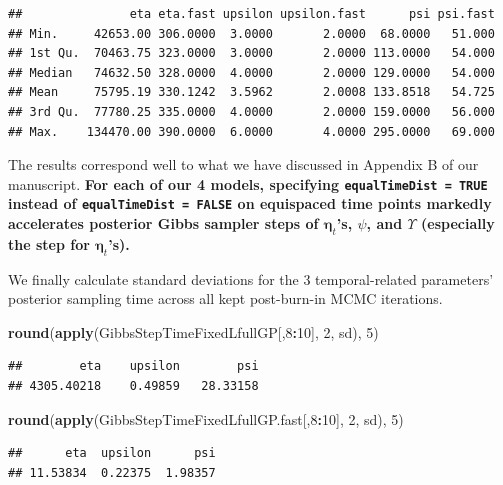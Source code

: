 \documentclass[
]{article}
\newenvironment{Shaded}{\begin{snugshade}}{\end{snugshade}}
\newcommand{\DecValTok}[1]{\textcolor[rgb]{0.00,0.00,0.81}{#1}}
\newcommand{\FunctionTok}[1]{\textcolor[rgb]{0.13,0.29,0.53}{\textbf{#1}}}
\newcommand{\NormalTok}[1]{#1}
\newcommand{\SpecialCharTok}[1]{\textcolor[rgb]{0.81,0.36,0.00}{\textbf{#1}}}
\begin{document}
\begin{verbatim}
##               eta eta.fast upsilon upsilon.fast      psi psi.fast
## Min.     42653.00 306.0000  3.0000       2.0000  68.0000   51.000
## 1st Qu.  70463.75 323.0000  3.0000       2.0000 113.0000   54.000
## Median   74632.50 328.0000  4.0000       2.0000 129.0000   54.000
## Mean     75795.19 330.1242  3.5962       2.0008 133.8518   54.725
## 3rd Qu.  77780.25 335.0000  4.0000       2.0000 159.0000   56.000
## Max.    134470.00 390.0000  6.0000       4.0000 295.0000   69.000
\end{verbatim}

The results correspond well to what we have discussed in Appendix B of
our manuscript. \textbf{For each of our 4 models, specifying
\texttt{equalTimeDist\ =\ TRUE} instead of
\texttt{equalTimeDist\ =\ FALSE} on equispaced time points markedly
accelerates posterior Gibbs sampler steps of \(\bm{\eta}_t\)'s,
\(\psi\), and \(\Upsilon\) (especially the step for \(\bm{\eta}_t\)'s).}

We finally calculate standard deviations for the 3 temporal-related
parameters' posterior sampling time across all kept post-burn-in MCMC
iterations.

\begin{Shaded}
\begin{Highlighting}[]
\FunctionTok{round}\NormalTok{(}\FunctionTok{apply}\NormalTok{(GibbsStepTimeFixedLfullGP[,}\DecValTok{8}\SpecialCharTok{:}\DecValTok{10}\NormalTok{], }\DecValTok{2}\NormalTok{, sd), }\DecValTok{5}\NormalTok{)}
\end{Highlighting}
\end{Shaded}

\begin{verbatim}
##        eta    upsilon        psi 
## 4305.40218    0.49859   28.33158
\end{verbatim}

\begin{Shaded}
\begin{Highlighting}[]
\FunctionTok{round}\NormalTok{(}\FunctionTok{apply}\NormalTok{(GibbsStepTimeFixedLfullGP.fast[,}\DecValTok{8}\SpecialCharTok{:}\DecValTok{10}\NormalTok{], }\DecValTok{2}\NormalTok{, sd), }\DecValTok{5}\NormalTok{)}
\end{Highlighting}
\end{Shaded}

\begin{verbatim}
##      eta  upsilon      psi 
## 11.53834  0.22375  1.98357
\end{verbatim}
\end{document}
